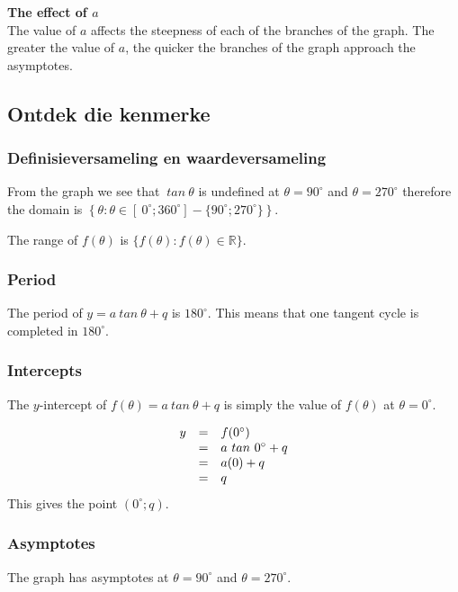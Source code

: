 \textbf{The effect of $a$}
\\
The value of $a$ affects the steepness of each of the branches of the graph. The greater the value of $a$, the quicker the branches of the graph approach the asymptotes.




\subsection*{Ontdek die kenmerke}
\subsubsection*{Definisieversameling en waardeversameling}
\nopagebreak
From the graph we see that $~tan~\theta$ is undefined at
$\theta = 90^{\circ}$ and $\theta = 270^{\circ}$ therefore the domain is
$\left\{ \theta: \theta \in [~0^{\circ}; 360^{\circ}] - \{90^{\circ}; 270^{\circ}\} \right\}$.

The range of $f(\theta)$ is $\{f(\theta): f(\theta) \in \mathbb{R}\}$.

\subsubsection*{Period}
The period of $y=a~tan~\theta+q$ is $180^{\circ}$. This means that one tangent cycle is completed in $180^{\circ}$. 


\subsubsection*{Intercepts}
\nopagebreak
The $y$-intercept of $f(\theta)=a~tan~\theta+q$ is simply the value of
$f(\theta)$ at $\theta = {0}^{\circ}$.

\begin{equation*}
\begin{array}{ccl}\hfill y& =& f({0}^{\circ })\hfill \\
 & =& a~tan~ {0}^{\circ } + q \hfill \\
 & =& a(0)+q\hfill \\
 & =& q\hfill 
\end{array}
\end{equation*}
This gives the point $(0^{\circ}; q)$.
\subsubsection*{Asymptotes}
\nopagebreak
The graph has asymptotes at $\theta ={90}^{\circ }$ and $\theta={270}^{\circ }$.

